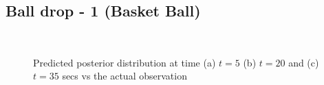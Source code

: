 \documentclass{article}
\begin{document}
\subsection{Ball drop - 1 (Basket Ball) }

\begin{figure}[H]
\begin{centering}
\,\,\,\,\,\,
\par\end{centering}

\caption{Predicted posterior distribution at time (a) $t=5$ (b) $t=20$ and
(c) $t=35$ secs vs the actual observation}


\label{balldrop1t5}

\end{figure}
\end{document}
